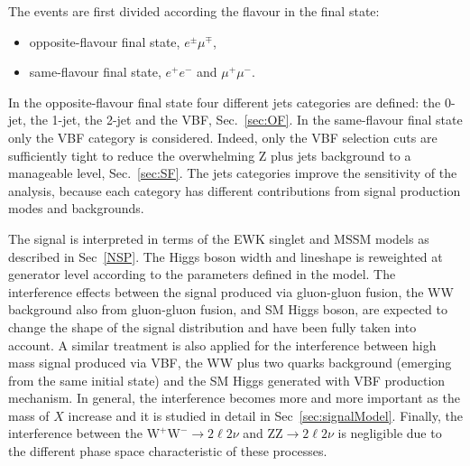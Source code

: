 The events are first divided according the flavour in the final state: 
\begin{itemize}
\item opposite-flavour final state, $e^{\pm} \mu^{\mp}$,
\item same-flavour final state, $e^+ e^-$ and  $\mu^+ \mu^-$. 
\end{itemize}
In the opposite-flavour final state four different jets categories are defined: the 0-jet, the 1-jet, the 2-jet and the VBF, Sec.~\ref{sec:OF}. 
In the same-flavour final state only the VBF category is considered. Indeed, only the VBF selection cuts are sufficiently tight to reduce the  overwhelming Z plus jets background to a manageable level, Sec.~\ref{sec:SF}. The jets categories improve the sensitivity of the analysis, because each category has different contributions from signal production modes and backgrounds.

The signal is interpreted in terms of the EWK singlet and MSSM models as described in Sec~\ref{NSP}. The Higgs boson width and lineshape is reweighted at generator level according to the parameters defined in the model. The interference effects between the signal produced via gluon-gluon fusion, the WW background also from gluon-gluon fusion, and SM Higgs boson, are expected to change the shape of the signal distribution and have been fully taken into account. 
A similar treatment is also applied for the interference between high mass signal produced via VBF, the WW plus two quarks background (emerging from the same initial state) and the SM Higgs generated with VBF production mechanism. In general, the interference becomes more and more important as the mass of $X$ increase and it is studied in detail in Sec~\ref{sec:signalModel}.
Finally, the interference between the $\mathrm{W^+W^-}\to2\ell2\nu$ and $\mathrm{ZZ}\to2\ell2\nu$ is negligible due to the different phase space characteristic of these processes.

